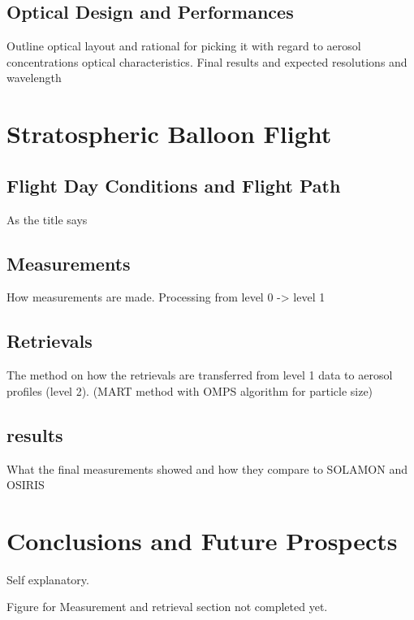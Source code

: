 \documentclass[11pt]{article}
\begin{document}
\subsection{Optical Design and Performances}

Outline optical layout and rational for picking it with regard to aerosol concentrations optical characteristics. Final results and expected resolutions and wavelength

\section{Stratospheric Balloon Flight}

\subsection{Flight Day Conditions and Flight Path}

As the title says

\subsection{Measurements}

How measurements are made. Processing from level 0 -> level 1

\subsection{Retrievals}

The method on how the retrievals are transferred from level 1 data to aerosol profiles (level 2). (MART method with OMPS algorithm for particle size)

\subsection{results}

What the final measurements showed and how they compare to SOLAMON and OSIRIS

\section{Conclusions and Future Prospects}

Self explanatory.

Figure for Measurement and retrieval section not completed yet.
\end{document}
